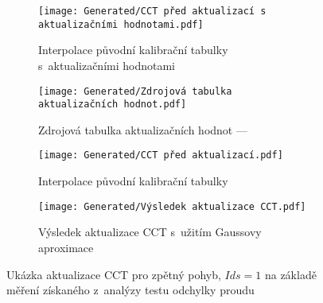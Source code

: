 \begin{landscapeimagepage}
    \begin{figure}[H]
        \centering
        \begin{subfigure}{.5\textheight}
            \centering
            \texttt{[image: Generated/CCT před aktualizací s aktualizačními hodnotami.pdf]}
            \caption{Interpolace původní kalibrační tabulky s~aktualizačními hodnotami}
            \label{fig:Původní kalibrační tabulka s~aktualizačními hodnotami}
        \end{subfigure}
        \vspace{0.5cm}
        \hspace{2.5cm}
        \begin{subfigure}{.5\textheight}
            \centering
            \texttt{[image: Generated/Zdrojová tabulka aktualizačních hodnot.pdf]}
            \caption{Zdrojová tabulka aktualizačních hodnot --- }
            \label{fig:Zdrojová tabulka aktualizačních hodnot}
        \end{subfigure}
        \vspace{0.5cm}
        \begin{subfigure}{.5\textheight}
            \centering
            \texttt{[image: Generated/CCT před aktualizací.pdf]}
            \caption{Interpolace původní kalibrační tabulky}
            \label{fig:Interpolace původní kalibrační tabulky}
        \end{subfigure}
        \hspace{2.5cm}
        \begin{subfigure}{.5\textheight}
            \centering
            \texttt{[image: Generated/Výsledek aktualizace CCT.pdf]}
            \caption{Výsledek aktualizace CCT s~užitím Gaussovy aproximace}
            \label{fig:Výsledek aktualizace CCT s~užitím Gaussovy aproximace}
        \end{subfigure}
        \caption{Ukázka aktualizace CCT pro zpětný pohyb, $Ids = 1$ na základě měření získaného z~analýzy testu odchylky proudu}
        \label{fig:Ukázka aktualizace CCT na základě měření získaného z~analýzy testu odchylky proudu}
    \end{figure}
\end{landscapeimagepage}